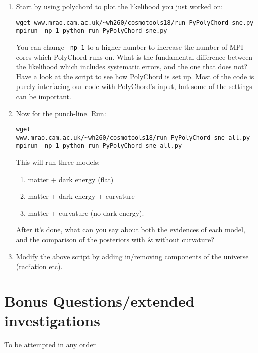 \documentclass{article}
\begin{document}
\begin{enumerate}[resume]
    \item Start by using polychord to plot the likelihood you just worked on:
\begin{verbatim}
wget www.mrao.cam.ac.uk/~wh260/cosmotools18/run_PyPolyChord_sne.py
mpirun -np 1 python run_PyPolyChord_sne.py
\end{verbatim}
        You can change \texttt{-np 1} to a higher number to increase the number of MPI cores which PolyChord runs on. What is the fundamental difference between the likelihood which includes systematic errors, and the one that does not? Have a look at the script to see how PolyChord is set up. Most of the code is purely interfacing our code with PolyChord's input, but some of the settings can be important.
    \item Now for the punch-line. Run:
\begin{verbatim}
wget www.mrao.cam.ac.uk/~wh260/cosmotools18/run_PyPolyChord_sne_all.py
mpirun -np 1 python run_PyPolyChord_sne_all.py
\end{verbatim}
        This will run three models:
        \begin{enumerate}
            \item matter + dark energy (flat)
            \item matter + dark energy + curvature
            \item matter + curvature (no dark energy).
        \end{enumerate}
        After it's done, what can you say about both the evidences of each model, and the comparison of the posteriors with \& without curvature?
    \item Modify the above script by adding in/removing components of the universe (radiation etc).

\end{enumerate}

\section{Bonus Questions/extended investigations}
To be attempted in any order
\end{document}
